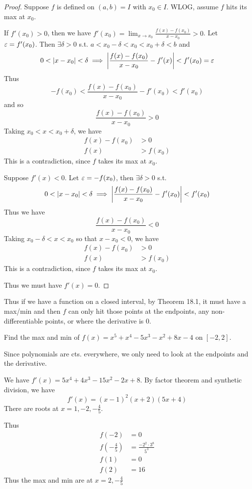 \documentclass{article}
\begin{document}
\begin{proof}
    Suppose $f$ is defined on $(a, b) = I$ with $x_0 \in I$. WLOG, assume $f$ hits its max at $x_0$. 

    If $f'(x_0) > 0$, then we have $f'(x_0) = \lim_{x\to x_0} \frac{f(x)-f(x_0)}{x-x_0} > 0$. Let $\varepsilon = f'(x_0)$. Then $\exists \delta > 0$ s.t. $a < x_0 - \delta < x_0 < x_0 + \delta < b$ and 
    \[
    0 < \abs{x - x_0} < \delta \implies \abs{\frac{f(x) - f(x_0)}{x - x_0} - f'(x)} < f'(x_0) = \varepsilon
    \]
    Thus \[
    -f(x_0) < \frac{f(x) - f(x_0)}{x- x_0} - f'(x_0) < f'(x_0)
    \]
    and so \[
    \frac{f(x) - f(x_0)}{x-x_0} > 0
    \]
    Taking $x_0 < x < x_0 + \delta$, we have \begin{align*}
        f(x) - f(x_0) &> 0\\
        f(x) &> f(x_0)
    \end{align*}
    This is a contradiction, since $f$ takes its max at $x_0$.

    Suppose $f'(x) < 0$. Let $\varepsilon = -f(x_0)$, then $\exists \delta > 0$ s.t. \[
    0 < |x-x_0| < \delta \implies \abs{\frac{f(x) - f(x_0)}{x-x_0} - f'(x_0)} < f'(x_0) 
    \]
    Thus we have\[
    \frac{f(x) - f(x_0)}{x-x_0} < 0
    \]
    Taking $x_0 - \delta < x < x_0$ so that $x - x_0 < 0$, we have \begin{align*}
        f(x) - f(x_0) &> 0\\
        f(x) &> f(x_0)
    \end{align*}
    This is a contradiction, since $f$ takes its max at $x_0$.

    Thus we must have $f'(x) = 0$.
\end{proof}
\begin{corollary}
    Thus if we have a function on a closed interval, by Theorem 18.1, it must have a max/min and then $f$ can only hit those points at the endpoints, any non-differentiable points, or where the derivative is $0$.
\end{corollary}
\begin{example}
    Find the max and min of $f(x) = x^5 + x^4 - 5x^3 - x^2 + 8x - 4$ on $[-2, 2]$.

    Since polynomials are cts. everywhere, we only need to look at the endpoints and the derivative.

    We have $f'(x) = 5x^4 + 4x^3 - 15x^2 - 2x + 8$. By factor theorem and synthetic division, we have \[
    f'(x) = (x-1)^2(x+2)(5x+4)
    \]
    There are roots at $x=1, -2, -\frac{4}{5}$.

    Thus \begin{align*}
        f(-2) &= 0\\
        f(-\frac{4}{5}) &= \frac{-2^2 \cdot 3^8}{5^3}\\
        f(1) &= 0\\
        f(2) &= 16
    \end{align*}
    Thus the max and min are at $x=2, -\frac{4}{5}$
\end{example}
\end{document}
